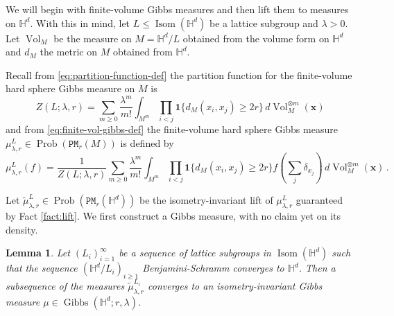 \documentclass[11pt]{amsart}
\newtheorem{lemma}[theorem]{Lemma}
\theoremstyle{definition}
\theoremstyle{remark}
\renewcommand{\H}{\mathbb{H}}
\newcommand{\cP}{\mathtt{PM}}
\newcommand{\Isom}{\operatorname{Isom}}
\newcommand{\Prob}{\operatorname{Prob}}
\newcommand{\Vol}{\operatorname{Vol}}
\newcommand{\vol}{\operatorname{Vol}}
\newcommand{\one}{\mathbf{1}}
\newcommand{\Gibbs}{\operatorname{Gibbs}}
\begin{document}
We will begin with finite-volume Gibbs measures and then lift them to measures on $\H^d$.   
With this in mind, let $L\le \Isom(\H^d)$ be a lattice subgroup and $\lambda>0$. Let $\vol_M$ be the measure on $M = \H^d/L$ obtained from the volume form on $\H^d$ and $d_M$ the metric on $M$ obtained from $\H^d$.

Recall from \eqref{eq:partition-function-def}  the partition function for the finite-volume hard sphere Gibbs measure on $M$ is $$Z(L;\lambda,r) = \sum_{m \geq 0} \frac{\lambda^m}{m!} \int_{M^m} \prod_{i < j} \one\{d_M(x_i,x_j) \geq 2r\} \,d\Vol_M^{\otimes m}(\mathbf{x})$$ and from  \eqref{eq:finite-vol-gibbs-def} the finite-volume hard sphere Gibbs measure $\mu_{\lambda,r}^L \in \Prob(\cP_r(M))$ is defined by $$\mu_{\lambda,r}^L(f) = \frac{1}{Z(L;\lambda,r)}\sum_{m \geq 0} \frac{\lambda^m}{m!} \int_{M^m} \prod_{i < j} \one\{d_M(x_i,x_j) \geq 2r\} f\left(\sum_{j} \delta_{x_j}\right)\,d\Vol_M^{\otimes m}(\mathbf{x})\,.$$

Let $\tilde{\mu}^L_{\lambda,r} \in \Prob(\cP_r(\H^d))$ be the isometry-invariant lift of $\mu^L_{\lambda,r}$ guaranteed by Fact \ref{fact:lift}.  We first construct a Gibbs measure, with no claim yet on its density.




\begin{lemma}\label{lem:construct-infinite-volume-from-limits}
    Let $(L_i)_{i=1}^\infty$ be a sequence of lattice subgroups in $\Isom(\H^d)$ such that the sequence $(\H^d/L_i)_{i \geq 1}$ Benjamini-Schramm converges to $\H^d$. Then a subsequence of the measures $\tilde{\mu}^{L_i}_{\lambda,r}$ converges to an isometry-invariant Gibbs measure $\mu \in \Gibbs(\H^d;r,\lambda)$.
\end{lemma}
\end{document}
